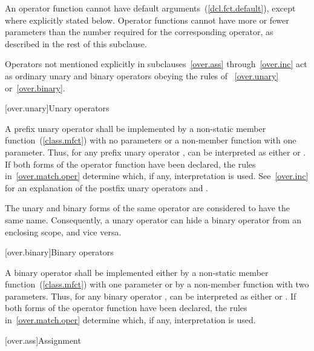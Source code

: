 \pnum
{}%
An operator function cannot have default arguments~(\ref{dcl.fct.default}),
except where explicitly stated below.
Operator
functions cannot have more or fewer parameters than the
number required for the corresponding operator, as
described in the rest of this subclause.

\pnum
Operators not mentioned explicitly in subclauses~\ref{over.ass} through~\ref{over.inc}
act as ordinary unary and binary
operators obeying the rules of ~\ref{over.unary} or~\ref{over.binary}.%
%

[over.unary]{Unary operators}%
%

\pnum
A prefix unary operator shall be implemented by a
non-static member function~(\ref{class.mfct}) with no parameters or a
non-member function with one parameter.
%
Thus, for any prefix unary operator
,
can be interpreted as either
or
.
If both forms of the operator function have been declared,
the rules in~\ref{over.match.oper} determine which, if any, interpretation is
used.
See~\ref{over.inc} for an explanation of the postfix unary operators
\tcode{++}
and
\tcode{\dcr}.

\pnum
The unary and binary forms of the same operator are considered to have
the same name.
\enternote
Consequently, a unary operator can hide a binary
operator from an enclosing scope, and vice versa.
\exitnote

[over.binary]{Binary operators}%
%

\pnum
A binary operator shall be implemented either by a non-static member
function~(\ref{class.mfct})
with one parameter or by a non-member function with two parameters.
%
Thus, for any binary operator
,
can be interpreted as either
or
.
If both forms of the operator function have been declared,
the rules in~\ref{over.match.oper} determine which, if any, interpretation is
used.

[over.ass]{Assignment}
%

